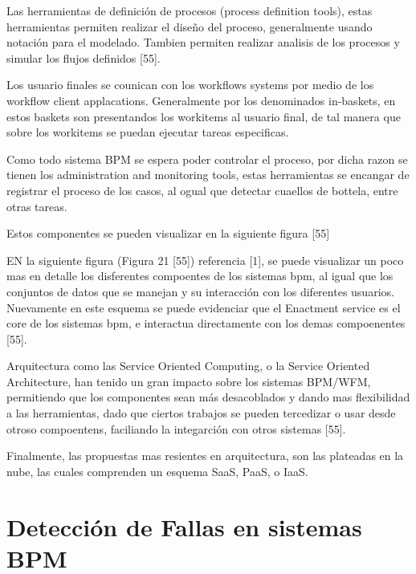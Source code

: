 Las herramientas de definición de procesos (process definition tools), estas herramientas permiten realizar el diseño del proceso, generalmente usando notación para el modelado. Tambien permiten realizar analisis de los procesos y simular los flujos definidos [55]. 


Los usuario finales se counican con los workflows systems por medio de los workflow client applacations. Generalmente por los denominados in-baskets, en estos baskets son presentandos los workitems al usuario final, de tal manera que sobre los workitems se puedan ejecutar tareas especificas. 

Como todo sistema BPM se espera poder controlar el proceso, por dicha razon se tienen los administration and monitoring tools, estas herramientas se encangar de registrar el proceso de los casos, al ogual que detectar cuaellos de bottela, entre otras tareas. 

Estos componentes se pueden visualizar en la siguiente figura [55]


EN la siguiente figura (Figura 21 [55]) referencia [1], se puede visualizar un poco mas en detalle los disferentes compoentes de los sistemas bpm, al igual que los conjuntos de datos que se manejan y su interacción con los diferentes usuarios. Nuevamente en este esquema se puede evidenciar que el Enactment service es el core de los sistemas bpm, e interactua directamente con los demas compoenentes [55].

Arquitectura como las Service Oriented Computing, o la Service Oriented Architecture, han tenido un gran impacto sobre los sistemas BPM/WFM, permitiendo que los componentes sean más desacoblados y dando mas flexibilidad a las herramientas, dado que ciertos trabajos se pueden tercedizar o usar desde otroso compoentens, faciliando la integarción con otros sistemas [55]. 

Finalmente, las propuestas mas resientes en arquitectura, son las plateadas en la nube, las cuales comprenden un esquema SaaS, PaaS, o IaaS. 



\section{Detección de Fallas en sistemas BPM} %
\label{section1.2}

